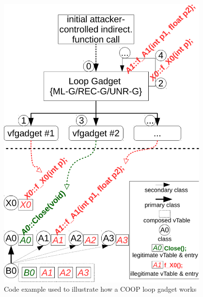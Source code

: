 \begin{figure}
 \begin{minipage}{.48\textwidth}
\usebox{\firstlisting}
\end{minipage}%
\hfill
%
\hspace{2.3cm}
\begin{minipage}{.48\textwidth}
    \includegraphics[width=0.95\textwidth]{figures/loop.pdf}
\end{minipage}
\caption{Code example used to illustrate how a COOP loop gadget works}
\label{Code example used to illustrate how a COOP loop gadget works}
\end{figure}

